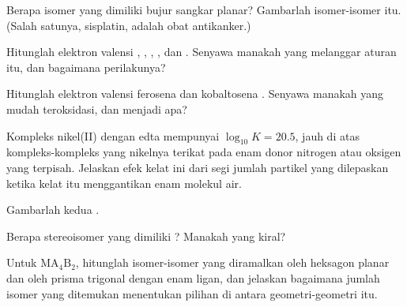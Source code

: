 \begin{exercise}[$\star\star$]\label{exo:b2:coordination-complexes:5}
Berapa isomer yang dimiliki \ce{[PtCl2(NH3)2]} bujur sangkar planar?
Gambarlah isomer-isomer itu. (Salah satunya, sisplatin, adalah obat
antikanker.)
\end{exercise}

\begin{exercise}[$\star\star$]\label{exo:b2:coordination-complexes:6}
Hitunglah elektron valensi , , ,
, dan . Senyawa manakah yang melanggar aturan itu,
dan bagaimana perilakunya?
\end{exercise}

\begin{exercise}[$\star\star$]\label{exo:b2:coordination-complexes:7}
Hitunglah elektron valensi ferosena dan kobaltosena . Senyawa
manakah yang mudah teroksidasi, dan menjadi apa?
\end{exercise}

\begin{exercise}[$\star\star$]\label{exo:b2:coordination-complexes:8}
Kompleks nikel(II) dengan edta mempunyai $\log_{10}K = 20.5$, jauh di atas
kompleks-kompleks yang nikelnya terikat pada enam donor nitrogen atau oksigen
yang terpisah. Jelaskan efek kelat ini dari segi jumlah partikel yang
dilepaskan ketika kelat itu menggantikan enam molekul air.
\end{exercise}

\begin{exercise}[$\star\star$]\label{exo:b2:coordination-complexes:9}
Gambarlah kedua  .
\end{exercise}

\begin{exercise}[$\star\star\star$]\label{exo:b2:coordination-complexes:10}
Berapa stereoisomer yang dimiliki \ce{[CoCl2(en)2]+}? Manakah yang kiral?
\end{exercise}

\begin{exercise}[$\star\star\star$]\label{exo:b2:coordination-complexes:11}
Untuk $\mathrm{MA_4B_2}$, hitunglah isomer-isomer yang diramalkan oleh
heksagon planar dan oleh prisma trigonal dengan enam ligan, dan jelaskan
bagaimana jumlah isomer yang ditemukan menentukan pilihan di antara
geometri-geometri itu.
\end{exercise}

